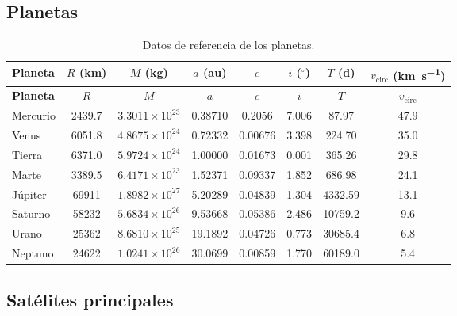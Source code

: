 \documentclass[11pt,a4paper]{article}
\theoremstyle{definition}
\begin{document}
\subsection*{Planetas}

\begin{longtable}{@{}lccccccc@{}}
\caption{Datos de referencia de los planetas.} \\
\toprule
\textbf{Planeta} & $R$ (\si{\kilo\metre}) & $M$ (\si{\kilo\gram}) & $a$ (\si{\astronomicalunit}) & $e$ & $i$ ($^{\circ}$) & $T$ (\si{\day}) & $v_{\text{circ}}$ (\si{\kilo\metre\per\second}) \\
\midrule
\endfirsthead
\toprule
\textbf{Planeta} & $R$ & $M$ & $a$ & $e$ & $i$ & $T$ & $v_{\text{circ}}$ \\
\midrule
\endhead
Mercurio & 2439.7 & $3.3011\times10^{23}$ & 0.38710 & 0.2056 & 7.006 & 87.97 & 47.9 \\
Venus    & 6051.8 & $4.8675\times10^{24}$ & 0.72332 & 0.00676 & 3.398 & 224.70 & 35.0 \\
Tierra   & 6371.0 & $5.9724\times10^{24}$ & 1.00000 & 0.01673 & 0.001 & 365.26 & 29.8 \\
Marte    & 3389.5 & $6.4171\times10^{23}$ & 1.52371 & 0.09337 & 1.852 & 686.98 & 24.1 \\
Júpiter  & 69911  & $1.8982\times10^{27}$ & 5.20289 & 0.04839 & 1.304 & 4332.59 & 13.1 \\
Saturno  & 58232  & $5.6834\times10^{26}$ & 9.53668 & 0.05386 & 2.486 & 10759.2 & 9.6 \\
Urano    & 25362  & $8.6810\times10^{25}$ & 19.1892 & 0.04726 & 0.773 & 30685.4 & 6.8 \\
Neptuno  & 24622  & $1.0241\times10^{26}$ & 30.0699 & 0.00859 & 1.770 & 60189.0 & 5.4 \\
\bottomrule
\end{longtable}

\subsection*{Satélites principales}
\end{document}
